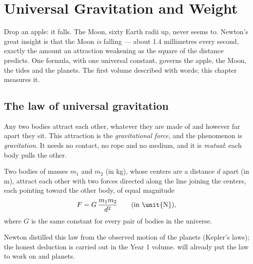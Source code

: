 \chapter{Universal Gravitation and Weight}\label{ch:g10:universal-gravitation}

Drop an apple: it falls. The Moon, sixty Earth radii up, never seems to.
Newton's great insight is that the Moon \emph{is} falling --- about
1.4 millimetres every second, exactly the amount an attraction
weakening as the square of the distance predicts. One formula, with one
universal constant, governs the apple, the Moon, the tides and the
planets. The first volume described  with words; this
chapter measures it.

\section{The law of universal gravitation}

\begin{definition}\label{def:g10:universal-gravitation:force}
Any two bodies attract each other, whatever they are made of and however
far apart they sit. This attraction is the \emph{gravitational
force}, and the phenomenon is
\emph{gravitation}. It needs no contact, no rope and
no medium, and it is \emph{mutual}: each body pulls the other.
\end{definition}

\begin{theorem}\label{thm:g10:universal-gravitation:law}
Two bodies of masses $m_1$ and $m_2$ (in \unit{kg}), whose centers are a
distance $d$ apart (in \unit{m}), attract each other with two forces
directed along the line joining the centers, each pointing toward the
other body, of equal magnitude
\[
F = G\,\frac{m_1 m_2}{d^2}
\qquad \text{(in \unit{N})},
\]
where $G$ is the same constant for every pair of bodies in the universe.
\end{theorem}
\admitted

\begin{remark}
Newton distilled this law from the observed motion of the planets
(Kepler's laws); the honest deduction is carried out in the Year 1
volume.  will already put the law to work
on  and planets.
\end{remark}

